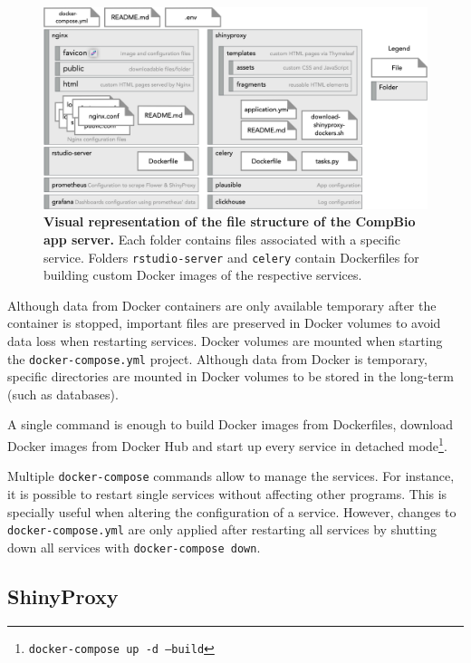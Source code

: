\begin{figure}[!h]
  \includegraphics[width=1\textwidth]{images/app-server/file-structure}
  \centering
  \caption[App server's file structure]{\textbf{Visual representation of the file structure of the CompBio app server.} Each folder contains files associated with a specific service. Folders \texttt{rstudio-server} and \texttt{celery} contain Dockerfiles for building custom Docker images of the respective services.}
  \label{fig:file-structure}
\end{figure}

Although data from Docker containers are only available temporary after the container is stopped, important files are preserved in Docker volumes to avoid data loss when restarting services. Docker volumes are mounted when starting the \texttt{docker-compose.yml} project. Although data from Docker is temporary, specific directories are mounted in Docker volumes to be stored in the long-term (such as databases).

A single command is enough to build Docker images from Dockerfiles, download Docker images from Docker Hub and start up every service in detached mode\footnote{\texttt{docker-compose up -d --build}}.

Multiple \texttt{docker-compose} commands allow to manage the services. For instance, it is possible to restart single services without affecting other programs. This is specially useful when altering the configuration of a service. However, changes to \texttt{docker-compose.yml} are only applied after restarting all services by shutting down all services with \texttt{docker-compose down}.


\subsection{ShinyProxy}

